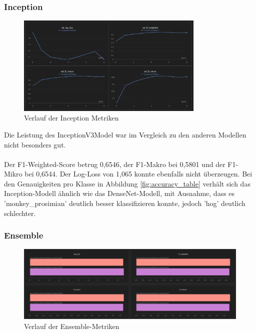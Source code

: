 \documentclass{article}
\begin{document}
\subsubsection{Inception}

\begin{figure}[!h]
    \centering
    \includegraphics[width=0.8\textwidth]{plots/Inception_wandb.png}
    \caption{\label{fig:wb_inception}Verlauf der Inception Metriken}
\end{figure}

Die Leistung des InceptionV3Model war im Vergleich zu den anderen Modellen nicht besonders gut.\\\\
Der F1-Weighted-Score betrug 0,6546, der F1-Makro bei 0,5801 und der F1-Mikro bei 0,6544. Der Log-Loss von 1,065 konnte ebenfalls nicht überzeugen. Bei den Genauigkeiten pro Klasse in Abbildung \ref{fig:accuracy_table} verhält sich das Inception-Modell ähnlich wie das DenseNet-Modell, mit Ausnahme, dass es 'monkey\_prosimian' deutlich besser klassifizieren konnte, jedoch 'hog' deutlich schlechter.

\subsubsection{Ensemble}

\begin{figure}[!h]
    \centering
    \includegraphics[width=1.0\textwidth]{plots/Ensemble.png}
    \caption{\label{fig:wb_ensemble}Verlauf der Ensemble-Metriken}
\end{figure}
\end{document}
